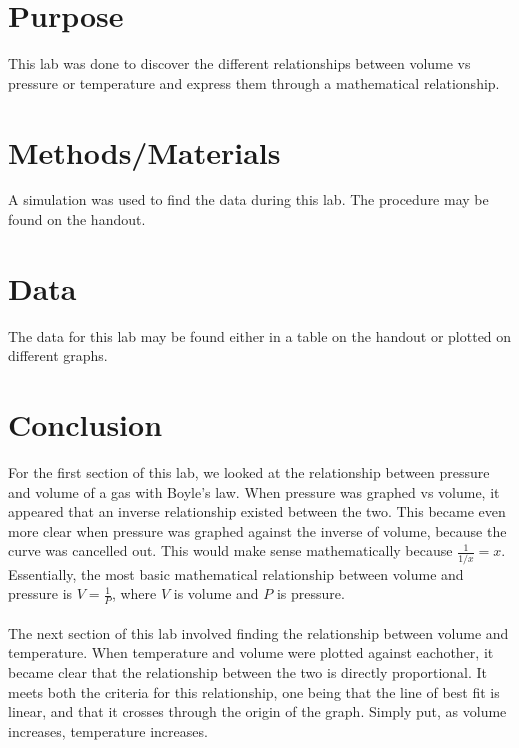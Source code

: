 \documentclass{article}
\begin{document}

\section{Purpose}

	This lab was done to discover the different relationships between volume vs pressure or temperature and express them through a mathematical relationship.

\section{Methods/Materials}

	A simulation was used to find the data during this lab. The procedure may be found on the handout.

\section{Data}

	The data for this lab may be found either in a table on the handout or plotted on different graphs.

\section{Conclusion}

	For the first section of this lab, we looked at the relationship between pressure and volume of a gas with Boyle's law. When pressure was graphed vs volume, it appeared that an inverse relationship existed between the two. This became even more clear when pressure was graphed against the inverse of volume, because the curve was cancelled out. This would make sense mathematically because  \(\frac{1}{1/x}=x\). Essentially, the most basic mathematical relationship between volume and pressure is \(V=\frac{1}{P}\), where \(V\) is volume and \(P\) is pressure.
\\\\
	The next section of this lab involved finding the relationship between volume and temperature. When temperature and volume were plotted against eachother, it became clear that the relationship between the two is directly proportional. It meets both the criteria for this relationship, one being that the line of best fit is linear, and that it crosses through the origin of the graph. Simply put, as volume increases, temperature increases.
\end{document}
